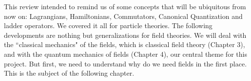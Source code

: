 This review intended to remind us of some concepts that will be ubiquitous from now on: Lagrangians, Hamiltonians, Commutators, Canonical Quantization and ladder operators. We covered it all for particle theories. The following developments are nothing but generalizations for field theories. We will deal with the ``classical mechanics" of the fields, which is classical field theory (Chapter 3), and with the quantum mechanics of fields (Chapter 4), our central theme for this project. But first, we need to understand why do we need fields in the first place. This is the subject of the following chapter.
